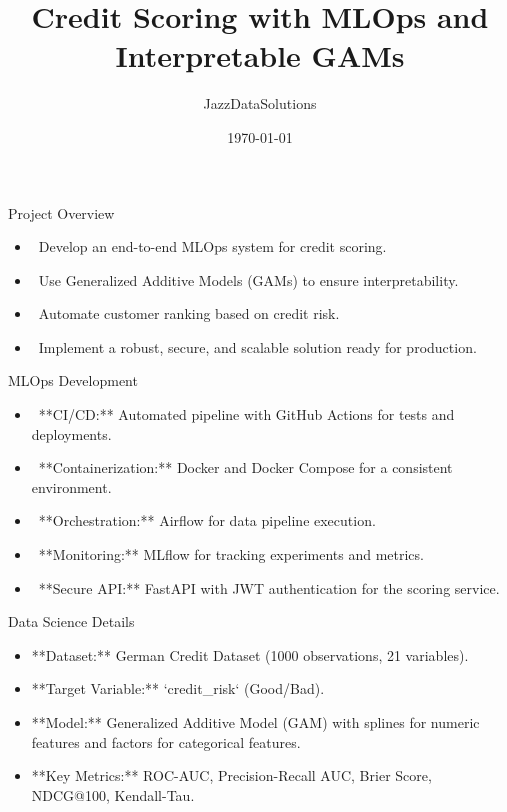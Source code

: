 \documentclass{beamer}
\title{Credit Scoring with MLOps and Interpretable GAMs}
\author{JazzDataSolutions}
\institute{Finvero}
\date{\today}
\begin{document}
\begin{frame}
  \titlepage
\end{frame}

\begin{frame}{Project Overview}
  \begin{itemize}
    \item \faRocket\  Develop an end-to-end MLOps system for credit scoring.
    \item \faChartLine\  Use Generalized Additive Models (GAMs) to ensure interpretability.
    \item \faUsers\  Automate customer ranking based on credit risk.
    \item \faShieldAlt\  Implement a robust, secure, and scalable solution ready for production.
  \end{itemize}
\end{frame}

\begin{frame}{MLOps Development}
  \begin{itemize}
    \item \faGithub\  **CI/CD:** Automated pipeline with GitHub Actions for tests and deployments.
    \item \faDocker\  **Containerization:** Docker and Docker Compose for a consistent environment.
    \item \faPaperPlane\  **Orchestration:** Airflow for data pipeline execution.
    \item \faChartBar\  **Monitoring:** MLflow for tracking experiments and metrics.
    \item \faKey\  **Secure API:** FastAPI with JWT authentication for the scoring service.
  \end{itemize}
\end{frame}

\begin{frame}{Data Science Details}
  \begin{itemize}
    \item **Dataset:** German Credit Dataset (1000 observations, 21 variables).
    \item **Target Variable:** `credit_risk` (Good/Bad).
    \item **Model:** Generalized Additive Model (GAM) with splines for numeric features and factors for categorical features.
    \item **Key Metrics:** ROC-AUC, Precision-Recall AUC, Brier Score, NDCG@100, Kendall-Tau.
  \end{itemize}
\end{frame}
\end{document}
